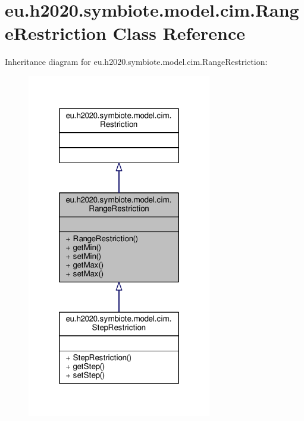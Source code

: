 \hypertarget{classeu_1_1h2020_1_1symbiote_1_1model_1_1cim_1_1RangeRestriction}{}\section{eu.\+h2020.\+symbiote.\+model.\+cim.\+Range\+Restriction Class Reference}
\label{classeu_1_1h2020_1_1symbiote_1_1model_1_1cim_1_1RangeRestriction}


Inheritance diagram for eu.\+h2020.\+symbiote.\+model.\+cim.\+Range\+Restriction\+:\nopagebreak
\begin{figure}[H]
\begin{center}
\leavevmode
\includegraphics[width=228pt]{classeu_1_1h2020_1_1symbiote_1_1model_1_1cim_1_1RangeRestriction__inherit__graph}
\end{center}
\end{figure}


